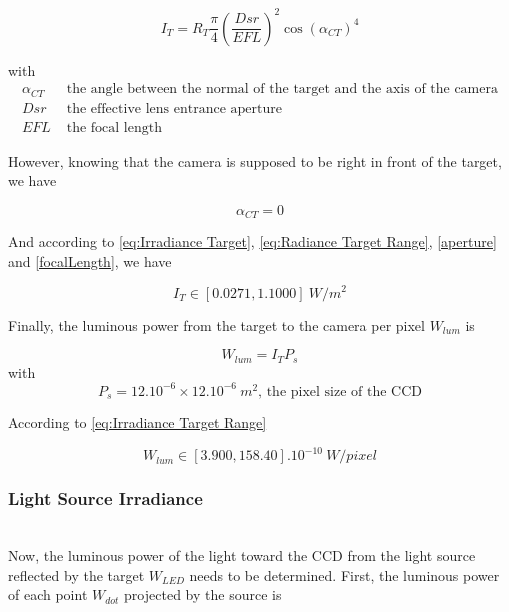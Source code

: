\begin{equation}
\label{eq:Irradiance Target}
I_T = R_T\frac{\pi}{4}\left(\frac{Dsr}{EFL}\right)^2\cos (\alpha_{CT})^4
\end{equation}

with
\begin{align*}
\alpha_{CT} & \mbox{ the angle between the normal of the target and the axis of the camera} \\
Dsr & \mbox{ the effective lens entrance aperture} \\
EFL & \mbox{ the focal length}
\end{align*}

However, knowing that the camera is supposed to be right in front of the target, we have

\begin{equation*}
\alpha_{CT} = 0
\end{equation*}

And according to \eqref{eq:Irradiance Target}, \eqref{eq:Radiance Target Range}, \ref{aperture} and \ref{focalLength}, we have

\begin{equation}
\label{eq:Irradiance Target Range}
I_T \in [0.0271, 1.1000] \ W/m^2
\end{equation}

Finally, the luminous power from the target to the camera per pixel $W_{lum}$ is 

\begin{equation}
\label{eq:Luminous Power}
W_{lum} = I_TP_s
\end{equation}
with
\begin{equation*}
P_s = 12.10^{-6}\times 12.10^{-6}\ m^2\mbox{, the pixel size of the CCD}
\end{equation*}

According to \eqref{eq:Irradiance Target Range}

\begin{equation}
\label{eq:Luminous Power Range}
W_{lum} \in [3.900, 158.40].10^{-10} \ W/pixel
\end{equation}





\subsubsection{Light Source Irradiance}
~\\
Now, the luminous power of the light toward the CCD from the light source reflected by the target $W_{LED}$ needs to be determined. First, the luminous power of each point $W_{dot}$ projected by the source is

